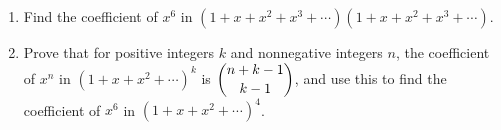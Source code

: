 \begin{enumerate}
\item[(a)] Find the coefficient of $x^6$ in $(1+x+x^2+x^3+\cdots)(1+x+x^2+x^3+\cdots)$.
\item[(b)] Prove that for positive integers $k$ and nonnegative integers $n$, the coefficient of $x^n$ in $(1+x+x^2+\cdots)^k$ is $\dbinom{n+k-1}{k-1}$, and use this to find the coefficient of $x^6$ in $(1+x+x^2+\cdots)^4$.
\end{enumerate}

